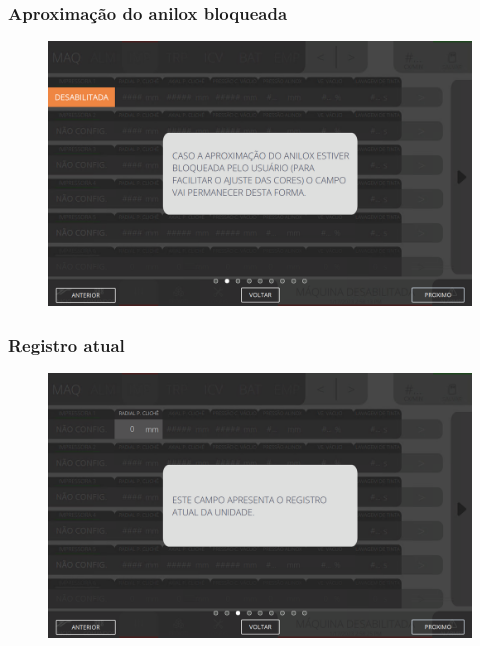 \newpage
\thispagestyle{fancy}
\vspace*{40 pt}
\subsubsection{\small{Aproximação do anilox bloqueada}} \label{sec:telaAjustesImpressorasAproximacaoAniloxBloqueada}
\vspace*{\fill}
\begin{figure}[h]
    \centering
    \includegraphics[width=576 px,height=360 px]{src/imagesICV/04-printters/01-printters/settings/2.png}
\end{figure}
\vspace*{\fill}

\newpage
\thispagestyle{fancy}
\vspace*{40 pt}
\subsubsection{\small{Registro atual}} \label{sec:telaAjustesImpressorasRegistroAtual}
\vspace*{\fill}
\begin{figure}[h]
    \centering
    \includegraphics[width=576 px,height=360 px]{src/imagesICV/04-printters/01-printters/settings/3.png}
\end{figure}
\vspace*{\fill}


